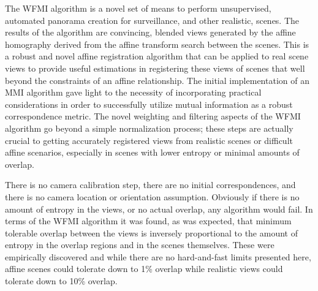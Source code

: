 %
%
%
%
%
%
%
%
%

%
%
%



The WFMI algorithm is a novel set of means to perform unsupervised, automated panorama creation for surveillance, and other realistic, scenes. The results of the algorithm are convincing, blended views generated by the affine homography derived from the affine transform search between the scenes. This is a robust and novel affine registration algorithm that can be applied to real scene views to provide useful estimations in registering these views of scenes that well beyond the constraints of an affine relationship. The initial implementation of an MMI algorithm gave light to the necessity of incorporating practical considerations in order to successfully utilize mutual information as a robust correspondence metric. The novel weighting and filtering aspects of the WFMI algorithm go beyond a simple normalization process; these steps are actually crucial to getting accurately registered views from realistic scenes or difficult affine scenarios, especially in scenes with lower entropy or minimal amounts of overlap.

There is no camera calibration step, there are no initial correspondences, and there is no camera location or orientation assumption. Obviously if there is no amount of entropy in the views, or no actual overlap, any algorithm would fail. In terms of the WFMI algorithm it was found, as was expected, that minimum tolerable overlap between the views is inversely proportional to the amount of entropy in the overlap regions and in the scenes themselves. These were empirically discovered and while there are no hard-and-fast limits presented here, affine scenes could tolerate down to 1\% overlap while realistic views could tolerate down to 10\% overlap.

